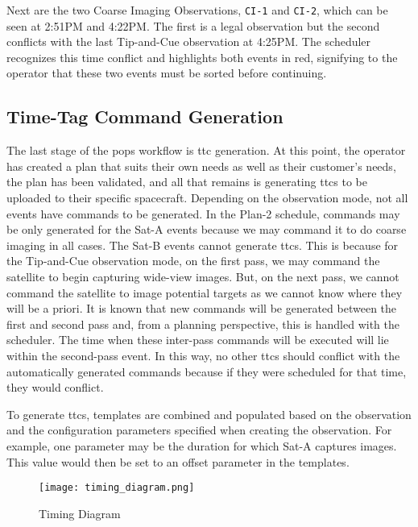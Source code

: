 Next are the two Coarse Imaging Observations, \texttt{CI-1} and \texttt{CI-2},
which can be seen at 2:51PM and 4:22PM. The first is a legal observation but
the second conflicts with the last Tip-and-Cue observation at 4:25PM. The
scheduler recognizes this time conflict and highlights both events in red,
signifying to the operator that these two events must be sorted before
continuing.

\subsection{Time-Tag Command Generation}

The last stage of the \gls{pops} workflow is \gls{ttc} generation.  At this
point, the operator has created a plan that suits their own needs as well as
their customer’s needs, the plan has been validated, and all that remains is
generating \glspl{ttc} to be uploaded to their specific spacecraft.  Depending
on the observation mode, not all events have commands to be generated. In the
Plan-2 schedule, commands may be only generated for the Sat-A events because we
may command it to do coarse imaging in all cases. The Sat-B events cannot
generate \glspl{ttc}. This is because for the Tip-and-Cue observation mode, on
the first pass, we may command the satellite to begin capturing wide-view
images.  But, on the next pass, we cannot command the satellite to image
potential targets as we cannot know where they will be a priori. It is known
that new commands will be generated between the first and second pass and, from
a planning perspective, this is handled with the scheduler. The time when these
inter-pass commands will be executed will lie within the second-pass event. In
this way, no other \glspl{ttc} should conflict with the automatically generated
commands because if they were scheduled for that time, they would conflict. 

To generate \glspl{ttc}, templates are combined and populated based on the
observation and the configuration parameters specified when creating the
observation. For example, one parameter may be the duration for which Sat-A
captures images. This value would then be set to an offset parameter in the
templates. 

\begin{figure}[h] 
    \centering
    \texttt{[image: timing\_diagram.png]} 
    \caption{Timing Diagram}
    \label{fig:timing} 
\end{figure}

